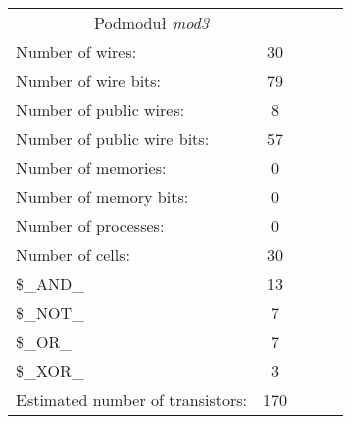 \begin{table}[!htb]
	\begin{minipage}{0.55\linewidth}
		\centering
		\begin{tabular}{lllll}
			\cline{1-2}
			\multicolumn{2}{|c|}{Podmoduł \emph{mod3}} &  &  &  \\ \cline{1-2}
			\multicolumn{1}{|l|}{Number of wires:} & \multicolumn{1}{c|}{30} &  &  &  \\ \cline{1-2}
			\multicolumn{1}{|l|}{Number of wire bits:} & \multicolumn{1}{c|}{79} &  &  &  \\ \cline{1-2}
			\multicolumn{1}{|l|}{Number of public wires:} & \multicolumn{1}{c|}{8} &  &  &  \\ \cline{1-2}
			\multicolumn{1}{|l|}{Number of public wire bits:} & \multicolumn{1}{c|}{57} &  &  &  \\ \cline{1-2}
			\multicolumn{1}{|l|}{Number of memories:} & \multicolumn{1}{c|}{0} &  &  &  \\ \cline{1-2}
			\multicolumn{1}{|l|}{Number of memory bits: } & \multicolumn{1}{c|}{0} &  &  &  \\ \cline{1-2}
			\multicolumn{1}{|l|}{Number of processes: } & \multicolumn{1}{c|}{0} &  &  &  \\ \cline{1-2}
			\multicolumn{1}{|l|}{Number of cells:} & \multicolumn{1}{c|}{30} &  &  &  \\ \cline{1-2}
			\multicolumn{1}{|l|}{\$\_AND\_} & \multicolumn{1}{c|}{13} &  &  &  \\ \cline{1-2}
			\multicolumn{1}{|l|}{\$\_NOT\_} & \multicolumn{1}{c|}{7} &  &  &  \\ \cline{1-2}
			\multicolumn{1}{|l|}{\$\_OR\_} & \multicolumn{1}{c|}{7} &  &  &  \\ \cline{1-2}
			\multicolumn{1}{|l|}{\$\_XOR\_} & \multicolumn{1}{c|}{3} &  &  &  \\ \cline{1-2}
			\multicolumn{1}{|l|}{Estimated number of transistors:} & \multicolumn{1}{c|}{170} &  &  &  \\ \cline{1-2}
			

\end{tabular}
\end{minipage}
\end{table}
